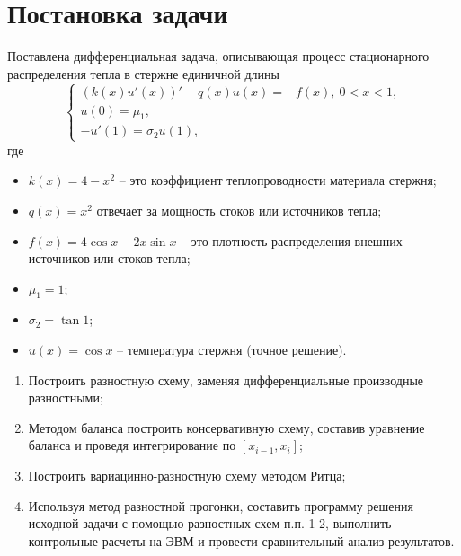 \documentclass[a4paper, 12pt]{article}
\begin{document}
    \section*{Постановка задачи}
    Поставлена дифференциальная задача, описывающая процесс стационарного распределения тепла в стержне единичной длины
    \begin{equation}
    	\begin{cases}
    		(k(x)u'(x))' - q(x)u(x) = -f(x),\ 0 < x<1,\\
    		u(0) = \mu_1,\\
    		-u'(1) = \sigma_2 u(1),
    	\end{cases}
    \end{equation}
    где 
    \begin{itemize}
    	\item $k(x) = 4-x^2$ -- это коэффициент теплопроводности материала стержня;
    	\item $q(x) = x^2$ отвечает за мощность стоков или источников тепла;
    	\item $f(x)=4\cos x - 2 x\sin x$ -- это плотность распределения внешних источников или стоков тепла;
    	\item $\mu_1 = 1$;
    	\item $\sigma_2 = \tan 1$;
    	\item $u(x) = \cos x$ -- температура стержня (точное решение).
    \end{itemize}
    \begin{enumerate}
    	\item Построить разностную схему, заменяя дифференциальные производные разностными;
    	\item Методом баланса построить консервативную схему, составив уравнение баланса и проведя интегрирование по $[x_{i-1}, x_i]$;
    	\item Построить вариацинно-разностную схему методом Ритца;
    	\item Используя метод разностной прогонки, составить программу решения исходной задачи с помощью разностных схем п.п. 1-2, выполнить контрольные расчеты на ЭВМ и провести сравнительный анализ результатов.
    \end{enumerate}
\end{document}
